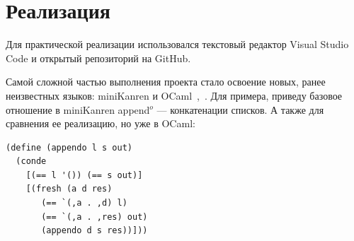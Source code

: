 % 


% 





\section{Реализация}
Для практической реализации использовался текстовый редактор Visual Studio Code и открытый репозиторий на GitHub.

Самой сложной частью выполнения проекта стало освоение новых, ранее неизвестных языков: miniKanren и OCaml~\cite{reasoned_schemer},~\cite{prog_ocaml}.
Для примера, приведу базовое отношение в miniKanren append$^o$ --- конкатенации списков. А также для сравнения ее реализацию, но уже в OCaml:


\begin{lstlisting}[caption=Append$^o$, frame=single]
  (define (appendo l s out)
  (conde
    [(== l '()) (== s out)]
    [(fresh (a d res)
       (== `(,a . ,d) l)
       (== `(,a . ,res) out)
       (appendo d s res))])) 
\end{lstlisting}

